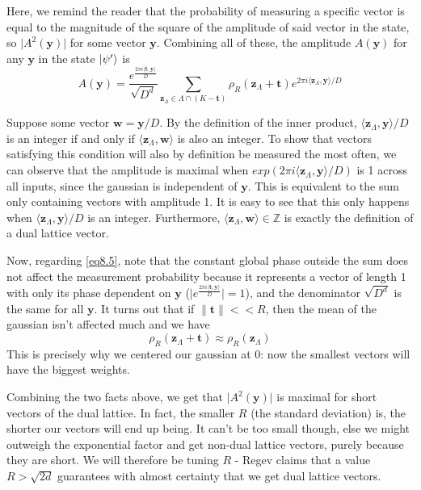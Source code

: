 Here, we remind the reader that the probability of measuring a specific vector is equal to the magnitude of the square of the amplitude of said vector in the state, so $\lvert A^2(\mathbf{y})\rvert$ for some vector $\mathbf{y}$. Combining all of these, the amplitude $A(\mathbf{y})$ for any $\mathbf{y}$ in the state $\ket{\psi'}$ is
\begin{equation}
    A(\mathbf{y}) = \frac{e^\frac{{2\pi i \langle \mathbf{t},\mathbf{y}} \rangle}{D}}{\sqrt{D^d}} \sum_{\mathbf{z}_\Lambda \in \Lambda \cap (K - \mathbf{t})} \rho_R(\mathbf{z}_\Lambda + \mathbf{t}) e^{2\pi i \langle \mathbf{z}_\Lambda,\mathbf{y} \rangle / D} 
    \label{eq8.5}
\end{equation}

Suppose some vector $\mathbf{w} = \mathbf{y} / D$. By the definition of the inner product,  $\langle \mathbf{z}_\Lambda,\mathbf{y} \rangle / D$ is an integer if and only if $\langle \mathbf{z}_\Lambda,\mathbf{w} \rangle$ is also an integer. To show that vectors satisfying this condition will also by definition be measured the most often, we can observe that the amplitude is maximal when $exp(2 \pi i \langle \mathbf{z}_\Lambda,\mathbf{y} \rangle / D)$ is 1 across all inputs, since the gaussian is independent of $\mathbf{y}$. This is equivalent to the sum only containing vectors with amplitude 1. It is easy to see that this only happens when $\langle \mathbf{z}_\Lambda,\mathbf{y} \rangle / D$ is an integer. Furthermore, $\langle \mathbf{z}_\Lambda,\mathbf{w} \rangle \in \mathbb{Z}$ is exactly the definition of a dual lattice vector.

Now, regarding \eqref{eq8.5}, note that the constant global phase outside the sum does not affect the measurement probability because it represents a vector of length 1 with only its phase dependent on $\mathbf{y}$ ($\lvert e^\frac{{2\pi i \langle \mathbf{t},\mathbf{y}} \rangle}{D} \rvert = 1$), and the denominator $\sqrt{D^d}$ is the same for all $\mathbf{y}$. It turns out that if $\lVert \mathbf{t} \rVert <<R$, then the mean of the gaussian isn't affected much and we have $$ \rho_R(\mathbf{z}_\Lambda + \mathbf{t}) \approx \rho_R(\mathbf{z}_\Lambda)$$ This is precisely why we centered our gaussian at 0: now the smallest vectors will have the biggest weights.

Combining the two facts above, we get that $\lvert A^2(\mathbf{y}) \rvert$ is maximal for short vectors of the dual lattice. In fact, the smaller $R$ 
(the standard deviation) is, the shorter our vectors will end up being. It can't be too small though, else we might outweigh the exponential factor and get non-dual lattice vectors, purely because they are short. We will therefore be tuning $R$ - Regev \cite{Regev2025} claims that a value $R>\sqrt{2d}$ guarantees with almost certainty that we get dual lattice vectors.

